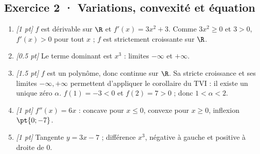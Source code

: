 \subsection*{Exercice 2 · Variations, convexité et équation}\begin{enumerate}

\item \textit{[1 pt]} $f$ est dérivable sur $\R$ et $f'(x)=3x^2+3$. Comme $3x^2\ge0$ et $3>0$, $f'(x)>0$ pour tout $x$ ; $f$ est strictement croissante sur $\R$.

\item \textit{[\num{0,5} pt]} Le terme dominant est $x^3$ : limites $-\infty$ et $+\infty$.

\item \textit{[\num{1,5} pt]} $f$ est un polynôme, donc continue sur $\R$. Sa stricte croissance et ses limites $-\infty,+\infty$ permettent d'appliquer le corollaire du TVI : il existe un unique zéro $\alpha$. $f(1)=-3<0$ et $f(2)=7>0$ ; donc $1<\alpha<2$.

\item \textit{[1 pt]} $f''(x)=6x$ : concave pour $x\le0$, convexe pour $x\ge0$, inflexion $\pt{0;-7}$.

\item \textit{[1 pt]} Tangente $y=3x-7$ ; différence $x^3$, négative à gauche et positive à droite de $0$.

\end{enumerate}

